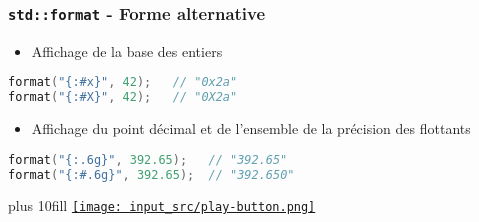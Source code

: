 \documentclass[C++.tex]{subfiles}
\begin{document}
\begin{frame}[fragile]
	\frametitle{\lstinline|std::format| - Forme alternative}
	\begin{itemize}
		\item Affichage de la base des entiers
	\end{itemize}

	\begin{lstlisting}[language=C++]
format("{:#x}", 42);   // "0x2a"
format("{:#X}", 42);   // "0X2a"\end{lstlisting}

	\begin{itemize}
		\item Affichage du point décimal et de l'ensemble de la précision des flottants
	\end{itemize}

	\begin{lstlisting}[language=C++]
format("{:.6g}", 392.65);   // "392.65"
format("{:#.6g}", 392.65);  // "392.650"\end{lstlisting}

	\vskip 10mm plus 10fill
	\hfill
	\href{https://godbolt.org/#z:OYLghAFBqd5QCxAYwPYBMCmBRdBLAF1QCcAaPECAMzwBtMA7AQwFtMQByARg9KtQYEAysib0QXACx8BBAKoBnTAAUAHpwAMvAFYTStJg1DIApACYAQuYukl9ZATwDKjdAGFUtAK4sGe1wAyeAyYAHI%2BAEaYxCCSAOykAA6oCoRODB7evnrJqY4CQSHhLFEx8baY9vkMQgRMxASZPn5cFVXptfUEhWGR0XoKdQ1N2a2DXT3FpRIAlLaoXsTI7BzmAMzByN5YANQma25Og8SYrPvYJhoAguub25h7B/zELEwE55c318EEO6/BEBmnxMcSs1x2O0G6BAKAWv32bgRkII0JAz1eBAg5jMIIsXBBABEdph4aCNITsaQ9mYzExKdSzBFsTNHoiDgyTABWNwMbH7MFfK4QqEwtBeeEHJEitEkDFYmlgVagkAANkJivpkjMLIRSL53N5NP5n2FKNFcNZUrNMpeb3lZg1yrVcQJGppVMVqkVOsl7P1PL5awFptRYolbLcyNR6Lt2MdFhAGmdrtW7p2Wp9EY5BsDwaj5vFlvZ0pjmLjSoTACoEcm3WYPRwvRxM3qjTmjUGTfnYYXdcXraX7fGQNW1tha6n6ztPd6i5H/YacZ3wd2w3Pu4Py7iR1zx%2BrJw2my2/W2Ax2BV3pWu%2B5GS7LY0a4oiybEKU%2B9k/cRoJDiXSDEWmXAaMe86nouxorleFo3hu95lo%2Bz4WN%2BkhvvOn4vlwv4Ev%2B9JARo%2BH4SB2ZnkueZQb2vq3gOcH2jhL64vif5MWhiHfriWGobhGhUtIOyYURC65sCkHWtelGwba8G/gmAB0KpUBSaZrAAnGYcmcgJYFCSJobQeJd6SbRypyYpU7YkwABe0QEAAnl4TiJMy66CeewlCquelZgZcp8vRLqkF%2BIDWISAUvgAtCFgUfthgGaTi7akZeomeVa0Y0b5SFBf5gXBdl4WRS%2B0X0mFXBxVyJEQYKIYFuGqUwpuj4JtYSboKZVKYcBzlaa51xJbpFFedRhkZSArV/mmGZdfFFXLu55G1f2aXDY1ICqISH4JgAGm16ZTpNMEuYlOk1eu3kPtJIBMuNe3alN5XgbN1U9gtVFLT5K2oDt%2B3iYdlVPWJg1ved27bddDZXLOB3dUdc3JQNdU2u9F2mGD04cBDzZ3Qlf0efDi31elK1jTFU4EMQXiYGV2OPbjL0SUj24KDtZMU1TM0Xsdz2nUNDPGfJO0qWpKoaVj7N9SdMFnVJ25ycAAuqepbMPWRcN01LRmySqmDy0LItQ9Nyvi1zks88DfMXKjguK6LhucwDCMNRdcl0qjWoyUr2mw/1aum9LypM6j5lWQ0NlOfr92e/9KX44jZtNWYaxra7t3h9TKve9zQN%2B/HaygyTPEpz90M4/NmcE8tTsqnLlsK8LHs9V7Ev6b7GtBQnss69bqdi71f7XM2%2BicJyvB%2BBwWikKgnAAVYliQgsSwPOsPCkAQmjNnMADWICctxtCcJII9rxPnC8AoiYr2vcxwLASCYKomDIOKJDkJQ9TAAoyiGJUQgIKgADuo9l5oBYIkOgbx0ifxCLQH%2B/9R7j2AaA%2BgMR37MESAoX%2BBBSAILoNEUIrAVi8GwUggA8uKGBACj53wflcYg78T6kCocgWo%2BBR68H4IIEQYh2BSBkIIRQKh1Bjx0HoAwRgUDBUsPoPAEQz6wGYGwS6qAUiYIAG79G4HEYeMw5ioESNUM%2BHAwpQn2ASUwlhrBmA0DsMKAB1MQtBrE2LvmTJg1jEiYHQIYRwyBT7z2WAMFEwRIHf1/hQ7gvAyaYBWMvP%2BxAmCJEvoPDgw9SBwN4JPDg2B76PyIMQHYqgAAcKowoqkkDsYAyBkA7AgCzBgG8WQQGntYKkuBCAkGpGsUqETL5zAQKcLAMRASkC3jvJJB9UlHwyafc%2Bq8hHaKSWYQ%2BQjj4cG6XMuYajiCpGcJIIAA%3D}{\texttt{[image: input\_src/play-button.png]}}
\end{frame}
 
\end{document}
